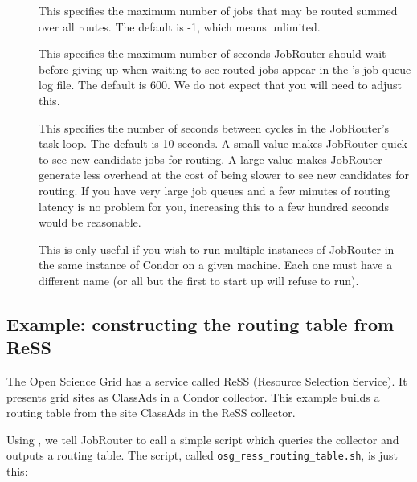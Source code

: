 \begin{description}
\item[] \label{JobRouterMaxJobs} This
specifies the maximum number of jobs that may be routed summed over
all routes.  The default is -1, which means unlimited.

\item[]
\label{MaxJobMirrorUpdateLag} This specifies the maximum number of
seconds JobRouter should wait before giving up when waiting to see
routed jobs appear in the 's job queue log file.  The
default is 600.  We do not expect that you will need to adjust this.

\item[]
\label{JobRouterPollingPeriod} This specifies the number of seconds
between cycles in the JobRouter's task loop.  The default is 10
seconds.  A small value makes JobRouter quick to see new candidate
jobs for routing.  A large value makes JobRouter generate less
overhead at the cost of being slower to see new candidates for
routing.  If you have very large job queues and a few minutes of
routing latency is no problem for you, increasing this to a few
hundred seconds would be reasonable.

\item[] \label{JobRouterName} This is only
useful if you wish to run multiple instances of JobRouter in the same
instance of Condor on a given machine.  Each one must have a different
name (or all but the first to start up will refuse to run).

\end{description}

\subsection{Example: constructing the routing table from ReSS}
\label{JobRouterReSSExample}

The Open Science Grid has a service called ReSS (Resource Selection
Service).  It presents grid sites as ClassAds in a Condor collector.
This example builds a routing table from the site ClassAds in the ReSS
collector.

Using , we tell JobRouter to call a
simple script which queries the collector and outputs a routing table.
The script, called \verb|osg_ress_routing_table.sh|, is just this:

